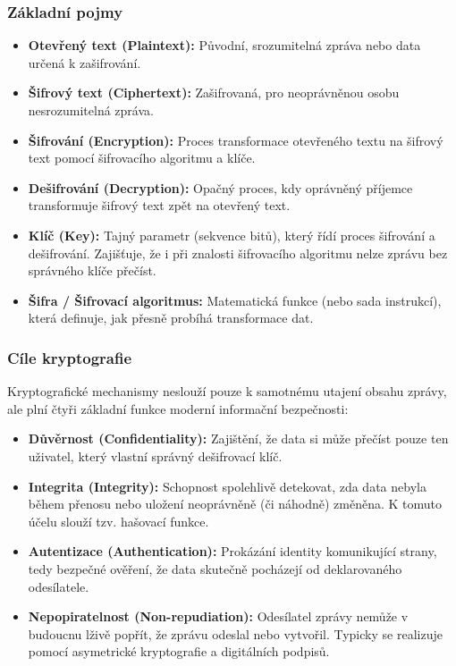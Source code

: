 \subsubsection*{Základní pojmy}
\begin{itemize}
    \item \textbf{Otevřený text (Plaintext):} Původní, srozumitelná zpráva nebo data určená k zašifrování.
    \item \textbf{Šifrový text (Ciphertext):} Zašifrovaná, pro neoprávněnou osobu nesrozumitelná zpráva.
    \item \textbf{Šifrování (Encryption):} Proces transformace otevřeného textu na šifrový text pomocí šifrovacího algoritmu a klíče.
    \item \textbf{Dešifrování (Decryption):} Opačný proces, kdy oprávněný příjemce transformuje šifrový text zpět na otevřený text.
    \item \textbf{Klíč (Key):} Tajný parametr (sekvence bitů), který řídí proces šifrování a dešifrování. Zajišťuje, že i při znalosti šifrovacího algoritmu nelze zprávu bez správného klíče přečíst.
    \item \textbf{Šifra / Šifrovací algoritmus:} Matematická funkce (nebo sada instrukcí), která definuje, jak přesně probíhá transformace dat.
\end{itemize}

\subsubsection*{Cíle kryptografie}
Kryptografické mechanismy neslouží pouze k samotnému utajení obsahu zprávy, ale plní čtyři základní funkce moderní informační bezpečnosti:
\begin{itemize}
    \item \textbf{Důvěrnost (Confidentiality):} Zajištění, že data si může přečíst pouze ten uživatel, který vlastní správný dešifrovací klíč.
    \item \textbf{Integrita (Integrity):} Schopnost spolehlivě detekovat, zda data nebyla během přenosu nebo uložení neoprávněně (či náhodně) změněna. K tomuto účelu slouží tzv. hašovací funkce.
    \item \textbf{Autentizace (Authentication):} Prokázání identity komunikující strany, tedy bezpečné ověření, že data skutečně pocházejí od deklarovaného odesílatele.
    \item \textbf{Nepopiratelnost (Non-repudiation):} Odesílatel zprávy nemůže v budoucnu lživě popřít, že zprávu odeslal nebo vytvořil. Typicky se realizuje pomocí asymetrické kryptografie a digitálních podpisů.
\end{itemize}


